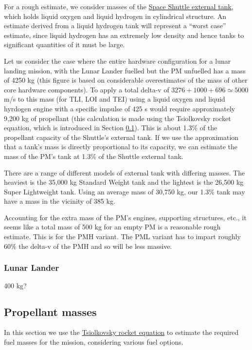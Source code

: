 \documentclass{report}
\begin{document}
For a rough estimate, we consider masses of the \href{http://en.wikipedia.org/wiki/Space_Shuttle_external_tank}{Space Shuttle external tank}, which holds liquid oxygen and liquid hydrogen in cylindrical structure.  An estimate derived from a liquid hydrogen tank will represent a ``worst case'' estimate, since liquid hydrogen has an extremely low density and hence tanks to significant quantities of it must be large.

Let us consider the case where the entire hardware configuration for a lunar landing mission, with the Lunar Lander fuelled but the PM unfuelled has a mass of 4250 kg (this figure is based on considerable overestimates of the mass of other core hardware components).  To apply a total delta-v of $3276 + 1000 + 696 \simeq 5000$ m/s to this mass (for TLI, LOI and TEI) using a liquid oxygen and liquid hyrdogen engine with a specific impulse of 425 s would require approximately 9,200 kg of propellant (this calculation is made using the Tsiolkovsky rocket equation, which is introduced in Section \ref{sec:rocket_eq}).  This is about 1.3\% of the propellant capacity of the Shuttle's external tank.  If we use the approximation that a tank's mass is directly proportional to its capacity, we can estimate the mass of the PM's tank at 1.3\% of the Shuttle external tank.

There are a range of different models of external tank with differing masses.  The heaviest is the 35,000 kg Standard Weight tank and the lightest is the 26,500 kg Super Lightweight tank.  Using an average mass of 30,750 kg, our 1.3\% tank may have a mass in the vicinity of 385 kg.

Accounting for the extra mass of the PM's engines, supporting structures, etc., it seems like a total mass of 500 kg for an empty PM is a reasonable rough estimate.  This is for the PMH variant.  The PML variant has to impart roughly 60\% the delta-v of the PMH and so will be less massive.

\subsubsection{Lunar Lander}

400 kg?

\subsection{Propellant masses} \label{sec:rocket_eq}

In this section we use the \href{http://en.wikipedia.org/wiki/Tsiolkovsky_rocket_equation}{Tsiolkovsky rocket equation} to estimate the required fuel masses for the mission, considering various fuel options.
\end{document}
